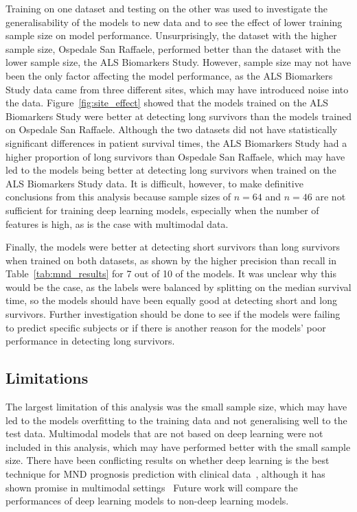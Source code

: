 Training on one dataset and testing on the other was used to investigate the generalisability of the models to new data and to see the effect of lower training sample size on model performance.
Unsurprisingly, the dataset with the higher sample size, Ospedale San Raffaele, performed better than the dataset with the lower sample size, the ALS Biomarkers Study.
However, sample size may not have been the only factor affecting the model performance, as the ALS Biomarkers Study data came from three different sites, which may have introduced noise into the data.
Figure~\ref{fig:site_effect} showed that the models trained on the ALS Biomarkers Study were better at detecting long survivors than the models trained on Ospedale San Raffaele.
Although the two datasets did not have statistically significant differences in patient survival times, the ALS Biomarkers Study had a higher proportion of long survivors than Ospedale San Raffaele, which may have led to the models being better at detecting long survivors when trained on the ALS Biomarkers Study data.
It is difficult, however, to make definitive conclusions from this analysis because sample sizes of $n=64$ and $n=46$ are not sufficient for training deep learning models, especially when the number of features is high, as is the case with multimodal data.

Finally, the models were better at detecting short survivors than long survivors when trained on both datasets, as shown by the higher precision than recall in Table~\ref{tab:mnd_results} for 7 out of 10 of the models.
It was unclear why this would be the case, as the labels were balanced by splitting on the median survival time, so the models should have been equally good at detecting short and long survivors.
Further investigation should be done to see if the models were failing to predict specific subjects or if there is another reason for the models' poor performance in detecting long survivors.

\subsection{Limitations}
The largest limitation of this analysis was the small sample size, which may have led to the models overfitting to the training data and not generalising well to the test data.
Multimodal models that are not based on deep learning were not included in this analysis, which may have performed better with the small sample size.
There have been conflicting results on whether deep learning is the best technique for MND prognosis prediction with clinical data~\cite{pancottiDeepLearningMethods2022, papaizEnsembleimbalancebasedClassificationAmyotrophic2024}, although it has shown promise in multimodal settings~\cite{vanderburghDeepLearningPredictions2017, meierConnectomeBasedPropagation2020}
Future work will compare the performances of deep learning models to non-deep learning models.

